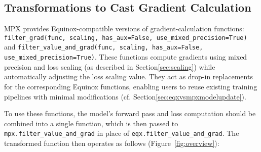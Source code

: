\documentclass[logo]{dsme}
\newcommand{\mpx}{\textsc{MPX}}
\newcommand{\capt}[1]{\mdseries{\emph{#1}}}
\begin{document}

\subsection{Transformations to Cast Gradient Calculation}
\label{sec:castinggradients}

\mpx{} provides Equinox-compatible versions of gradient-calculation functions: \texttt{filter\_grad(func, scaling, has\_aux=False, use\_mixed\_precision=True)} and \texttt{filter\_value\_and\_grad(func, scaling, has\_aux=False, use\_mixed\_precision=True)}. 
These functions compute gradients using mixed precision and loss scaling (as described in Section\ref{sec:scaling}) while automatically adjusting the loss scaling value. 
They act as drop-in replacements for the corresponding Equinox functions, enabling users to reuse existing training pipelines with minimal modifications (cf. Section\ref{sec:eqxvsmpxmodelupdate}).

To use these functions, the model's forward pass and loss computation should be combined into a single function, which is then passed to \texttt{mpx.filter\_value\_and\_grad} in place of \texttt{eqx.filter\_value\_and\_grad}. 
The transformed function then operates as follows (Figure~\ref{fig:overview}):
\end{document}
